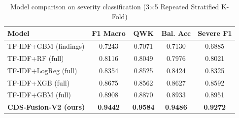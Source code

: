 \begin{table}[h]
\centering
\caption{Model comparison on severity classification (3×5 Repeated Stratified K-Fold)}
\label{tab:comparison}
\begin{tabular}{lcccc}
\toprule
Model & F1 Macro & QWK & Bal. Acc & Severe F1 \\
\midrule
TF-IDF+GBM (findings) & 0.7243 & 0.7071 & 0.7130 & 0.6885 \\
TF-IDF+RF (full) & 0.8116 & 0.8049 & 0.7976 & 0.8021 \\
TF-IDF+LogReg (full) & 0.8354 & 0.8525 & 0.8424 & 0.8325 \\
TF-IDF+XGB (full) & 0.8675 & 0.8562 & 0.8627 & 0.8592 \\
TF-IDF+GBM (full) & 0.8908 & 0.8870 & 0.8933 & 0.8951 \\
\textbf{CDS-Fusion-V2 (ours)} & \textbf{0.9442} & \textbf{0.9584} & \textbf{0.9486} & \textbf{0.9272} \\
\bottomrule
\end{tabular}
\end{table}